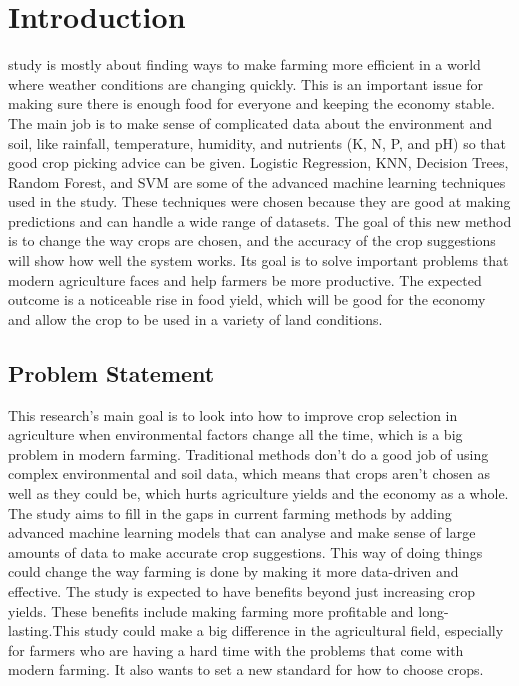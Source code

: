 \section{Introduction}

 study is mostly about finding ways to make farming more efficient in a world where weather conditions are changing quickly. This is an important issue for making sure there is enough food for everyone and keeping the economy stable. The main job is to make sense of complicated data about the environment and soil, like rainfall, temperature, humidity, and nutrients (K, N, P, and pH) so that good crop picking advice can be given. Logistic Regression, KNN, Decision Trees, Random Forest, and SVM are some of the advanced machine learning techniques used in the study. These techniques were chosen because they are good at making predictions and can handle a wide range of datasets. The goal of this new method is to change the way crops are chosen, and the accuracy of the crop suggestions will show how well the system works. Its goal is to solve important problems that modern agriculture faces and help farmers be more productive. The expected outcome is a noticeable rise in food yield, which will be good for the economy and allow the crop to be used in a variety of land conditions.   

\subsection {Problem Statement}
This research's main goal is to look into how to improve crop selection in agriculture when environmental factors change all the time, which is a big problem in modern farming. Traditional methods don't do a good job of using complex environmental and soil data, which means that crops aren't chosen as well as they could be, which hurts agriculture yields and the economy as a whole. The study aims to fill in the gaps in current farming methods by adding advanced machine learning models that can analyse and make sense of large amounts of data to make accurate crop suggestions. This way of doing things could change the way farming is done by making it more data-driven and effective. The study is expected to have benefits beyond just increasing crop yields. These benefits include making farming more profitable and long-lasting.This study could make a big difference in the agricultural field, especially for farmers who are having a hard time with the problems that come with modern farming. It also wants to set a new standard for how to choose crops.

